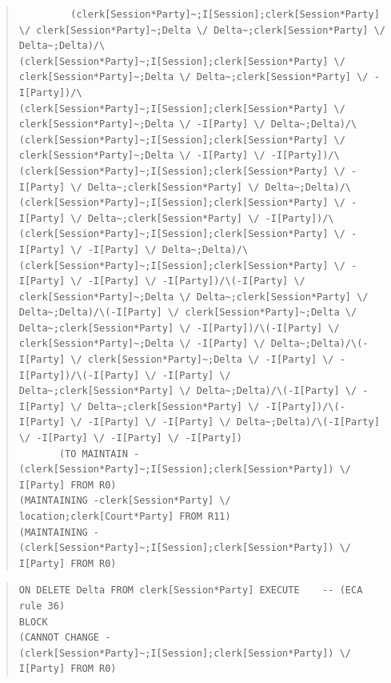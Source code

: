 \documentclass[10pt,a4paper]{report}              %
\theoremstyle{plain}\theorembodyfont{\rmfamily}\newtheorem{definition}{Definition}[section]
\theoremstyle{plain}\theorembodyfont{\rmfamily}\newtheorem{designrule}[definition]{Requirement}
\begin{document}
\begin{quote}
\begin{verbatim}
         (clerk[Session*Party]~;I[Session];clerk[Session*Party] \/ clerk[Session*Party]~;Delta \/ Delta~;clerk[Session*Party] \/ Delta~;Delta)/\(clerk[Session*Party]~;I[Session];clerk[Session*Party] \/ clerk[Session*Party]~;Delta \/ Delta~;clerk[Session*Party] \/ -I[Party])/\(clerk[Session*Party]~;I[Session];clerk[Session*Party] \/ clerk[Session*Party]~;Delta \/ -I[Party] \/ Delta~;Delta)/\(clerk[Session*Party]~;I[Session];clerk[Session*Party] \/ clerk[Session*Party]~;Delta \/ -I[Party] \/ -I[Party])/\(clerk[Session*Party]~;I[Session];clerk[Session*Party] \/ -I[Party] \/ Delta~;clerk[Session*Party] \/ Delta~;Delta)/\(clerk[Session*Party]~;I[Session];clerk[Session*Party] \/ -I[Party] \/ Delta~;clerk[Session*Party] \/ -I[Party])/\(clerk[Session*Party]~;I[Session];clerk[Session*Party] \/ -I[Party] \/ -I[Party] \/ Delta~;Delta)/\(clerk[Session*Party]~;I[Session];clerk[Session*Party] \/ -I[Party] \/ -I[Party] \/ -I[Party])/\(-I[Party] \/ clerk[Session*Party]~;Delta \/ Delta~;clerk[Session*Party] \/ Delta~;Delta)/\(-I[Party] \/ clerk[Session*Party]~;Delta \/ Delta~;clerk[Session*Party] \/ -I[Party])/\(-I[Party] \/ clerk[Session*Party]~;Delta \/ -I[Party] \/ Delta~;Delta)/\(-I[Party] \/ clerk[Session*Party]~;Delta \/ -I[Party] \/ -I[Party])/\(-I[Party] \/ -I[Party] \/ Delta~;clerk[Session*Party] \/ Delta~;Delta)/\(-I[Party] \/ -I[Party] \/ Delta~;clerk[Session*Party] \/ -I[Party])/\(-I[Party] \/ -I[Party] \/ -I[Party] \/ Delta~;Delta)/\(-I[Party] \/ -I[Party] \/ -I[Party] \/ -I[Party])
       (TO MAINTAIN -(clerk[Session*Party]~;I[Session];clerk[Session*Party]) \/ I[Party] FROM R0)
(MAINTAINING -clerk[Session*Party] \/ location;clerk[Court*Party] FROM R11)
(MAINTAINING -(clerk[Session*Party]~;I[Session];clerk[Session*Party]) \/ I[Party] FROM R0)
\end{verbatim}
\end{quote}
\begin{quote}
\begin{verbatim}
ON DELETE Delta FROM clerk[Session*Party] EXECUTE    -- (ECA rule 36)
BLOCK
(CANNOT CHANGE -(clerk[Session*Party]~;I[Session];clerk[Session*Party]) \/ I[Party] FROM R0)
\end{verbatim}
\end{quote}
\end{document}
